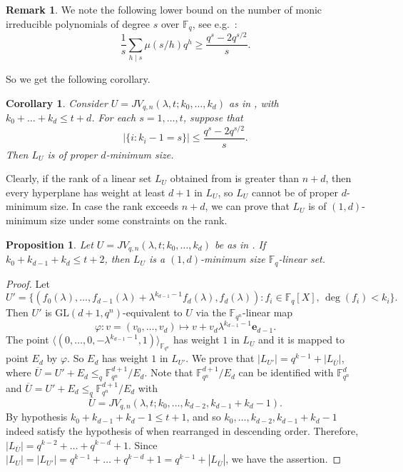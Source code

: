 \documentclass[11pt]{article}
\newtheorem{corollary}[theorem]{Corollary}
\newtheorem{proposition}[theorem]{Proposition}
\theoremstyle{definition}
\newtheorem{remark}[theorem]{Remark}
\newcommand{\fqn}{\mathbb{F}_{q^n}}
\newcommand{\F}{{\mathbb F}}
\newcommand{\fq}{{\mathbb F}_{q}}
\newcommand{\e}{\mathbf e}
\begin{document}
\begin{remark}
We note the following lower bound on the number of monic irreducible polynomials of degree $s$ over $\F_q$, see e.g.\ \cite{blaser2012computational}:
\[
\frac{1}{s} \sum_{h \mid s} \mu \left(s/h\right)q^h \geq \frac{q^s-2q^{s/2}}{s}.
\]
\end{remark}

So we get the following corollary.

\begin{corollary} \label{cor:necconditionhyper}
Consider $U = JV_{q,n}(\lambda,t;k_0,\dots,k_d)$ as in , with $k_0 + \ldots + k_d \leq t+d$.
For each $s = 1, \dots, t$, suppose that
\[
 |\{ i \colon k_i-1 = s \} | \leq \frac{q^s-2q^{s/2}}{s}.
\]
Then $L_U$ is of proper $d$-minimum size.
\end{corollary}



Clearly, if the rank of a linear set $L_U$ obtained from   is greater than $n+d$, then every hyperplane has weight at least $d+1$ in $L_U$, so $L_U$ cannot be of proper $d$-minimum size.
In case the rank exceeds $n+d$, we can prove that $L_U$ is of $(1,d)$-minimum size under some constraints on the rank.

\begin{proposition}
Let $U = JV_{q,n}(\lambda,t;k_0, \dots, k_d)$ be as in .
If $k_0 + k_{d-1} + k_d \leq t + 2$, then $L_U$ is a $(1,d)$-minimum size $\fq$-linear set.
\end{proposition}

\begin{proof}
Let 
\[
 U'=\{(f_0(\lambda), \ldots, f_{d-1}(\lambda)+\lambda^{k_{d-1}-1}f_{d}(\lambda), f_{d}(\lambda)) \colon f_i \in \fq[X], \, \deg(f_i) < k_i \}.
\]
Then $U'$ is $\mathrm{GL}(d+1,q^n)$-equivalent to $U$ via the $\fqn$-linear map
\[
 \varphi: v = (v_0, \dots, v_d) \mapsto v + v_d \lambda^{k_{d-1}-1} \e_{d-1}.
\]
The point $\langle (0,\ldots,0,-\lambda^{k_{d-1}-1},1) \rangle_{\F_{q^n}}$ has weight $1$ in $L_U$ and it is mapped to point $E_{d}$ by $\varphi$.
So $E_{d}$ has weight $1$ in $L_{U'}$.
We prove that 
$\lvert L_{U'} \rvert=q^{k-1}+\lvert L_{\overline{U}} \rvert$,
where $\overline{U}=U'+E_d \leq_q \F_{q^n}^{d+1}/E_d$.
Note that $\F_{q^n}^{d+1}/E_d$ can be identified with $\F_{q^n}^{d}$ and 
$\overline{U}=U'+E_d \leq_q \F_{q^n}^{d+1}/E_d$ with 
\[
 \overline{U} = JV_{q,n}(\lambda,t;k_0, \dots, k_{d-2}, k_{d-1} + k_d - 1).
\]
By hypothesis $k_{0}+k_{d-1}+k_{d}-1 \leq t+1$, and so $k_0, \dots, k_{d-2}, k_{d-1} + k_d - 1$ indeed satisfy the hypothesis of  when rearranged in descending order.
Therefore, $\lvert L_{\overline{U}} \rvert=q^{k-2}+\ldots+q^{k-d}+1$.
Since $\lvert L_{U} \rvert=\lvert L_{U'} \rvert=q^{k-1}+\ldots+q^{k-d}+1=q^{k-1}+ |L_{\overline{U}}|$, we have the assertion.
\end{proof}
\end{document}
